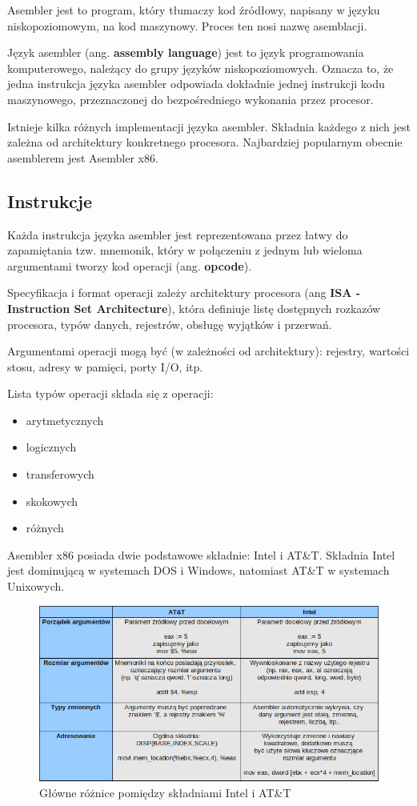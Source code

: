 \documentclass[a4paper,12pt]{article}
\begin{document}
Asembler jest to program, który tłumaczy kod źródłowy, napisany w języku niskopoziomowym, na kod maszynowy. Proces ten nosi nazwę asemblacji. 

Język asembler (ang. \textbf{assembly language}) jest to język programowania komputerowego, należący do grupy języków niskopoziomowych. Oznacza to, że jedna instrukcja języka asembler odpowiada dokładnie jednej instrukcji kodu maszynowego, przeznaczonej do bezpośredniego wykonania przez procesor.

Istnieje kilka różnych implementacji języka asembler. Składnia każdego z nich jest zależna od architektury konkretnego procesora. Najbardziej popularnym obecnie asemblerem jest Asembler x86.

\subsection{Instrukcje}

Każda instrukcja języka asembler jest reprezentowana przez łatwy do zapamiętania tzw. mnemonik, który w połączeniu z jednym lub wieloma argumentami tworzy kod operacji (ang. \textbf{opcode}).

Specyfikacja i format operacji zależy architektury procesora (ang \textbf{ISA - Instruction Set Architecture}), która definiuje listę dostępnych rozkazów procesora, typów danych, rejestrów, obsługę wyjątków i przerwań.

Argumentami operacji mogą być (w zależności od architektury): rejestry, wartości stosu, adresy w pamięci, porty I/O, itp.

Lista typów operacji składa się z operacji:
\begin{itemize}
\item arytmetycznych
\item logicznych
\item transferowych
\item skokowych
\item różnych
\end{itemize}

Asembler x86 posiada dwie podstawowe składnie: Intel i AT\&T. Składnia Intel jest dominującą w systemach DOS i Windows, natomiast AT\&T w systemach Unixowych\cite{asm_syn}.

\begin{figure}[h!]
\centering
\includegraphics[scale=0.6]{gfx/asm_syn_diff.png}
\caption{Główne różnice pomiędzy składniami Intel i AT\&T\cite{asm_syn}}
\end{figure}
\end{document}
